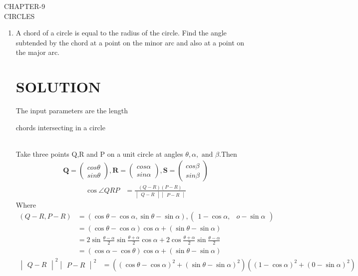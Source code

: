 \documentclass[12pt]{article}
\newcommand{\mydet}[1]{\ensuremath{\begin{vmatrix}#1\end{vmatrix}}}
\newcommand{\myvec}[1]{\ensuremath{\begin{pmatrix}#1\end{pmatrix}}}
\let\vec\mathbf
\begin{document}
\begin{center}
\textbf\large{CHAPTER-9 \\ CIRCLES}

\end{center}
\begin{enumerate}
\section{EXERCISE-10.5}
\item A chord of a circle is equal to the radius of the circle. Find the angle subtended by the chord at a point on the minor arc and also at a point on the major arc.
\section{SOLUTION}
The input parameters are the length\\
\begin{table}[ht!]
	
\caption{chords intersecting in a circle}
\label{table}	
\end{table}
\\
Take three points Q,R and P on a unit circle  at angles $\theta,\alpha,\text{ and }\beta$.Then
\begin{align}
	\vec{Q} = \myvec{cos\theta\\sin\theta},
	\vec{R} = \myvec{cos\alpha\\sin\alpha},
	\vec{S} = \myvec{cos\beta\\sin\beta}
\end{align}
\begin{align}
	\cos\angle QRP&= \frac{(Q-R)(P-R)}{\mydet{Q-R}\mydet{P-R}}\label{2}
\end{align}
Where
\begin{align}
(Q-R, P-R)&= (\cos\theta-\cos\alpha,\sin\theta-\sin\alpha),\myvec{1-\cos\alpha,& o-\sin\alpha}\\
&=(\cos\theta-\cos\alpha)\cos\alpha+(\sin\theta-\sin\alpha)\\
&=2\sin\frac{\theta-\alpha}{2}\sin\frac{\theta+\alpha}{2}\cos\alpha+2\cos\frac{\theta+\alpha}{2}\sin\frac{\theta-\alpha}{2}\\
&=(\cos\alpha-\cos\theta)\cos\alpha+(\sin\theta-\sin\alpha)\label{6}
\end{align}
\begin{align}
\mydet{Q-R}^2\mydet{P-R}^2 &= ((\cos\theta-\cos\alpha)^2+(\sin\theta-\sin\alpha)^2)
	((1-\cos\alpha)^2+(0-\sin\alpha)^2)\\

\end{align}
\end{enumerate}
\end{document}
